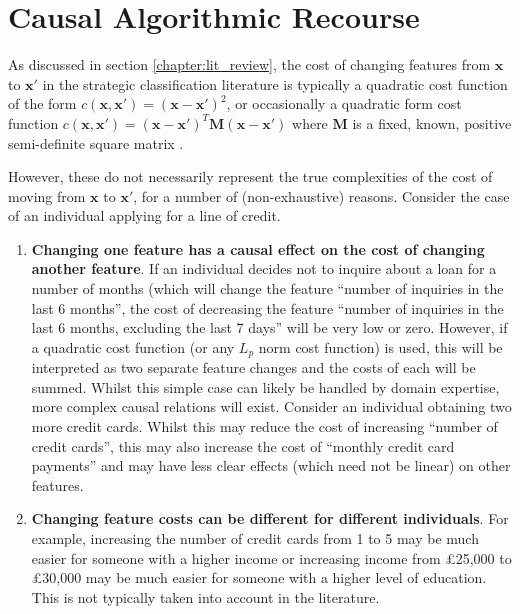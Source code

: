 \chapter{Causal Algorithmic Recourse} \label{chapter:causal_recourse}

As discussed in section \ref{chapter:lit_review}, the cost of changing features from $\boldsymbol{x}$ to $\boldsymbol{x}'$ in the strategic classification literature is typically a quadratic cost function of the form $c(\boldsymbol{x}, \boldsymbol{x}') = (\boldsymbol{x} - \boldsymbol{x}')^2$, or occasionally a quadratic form cost function $c(\boldsymbol{x}, \boldsymbol{x}') = (\mathbf{x-x'})^T\mathbf{M}(\mathbf{x-x'})$ where $\mathbf{M}$ is a fixed, known, positive semi-definite square matrix \citep{bechavodInformationDiscrepancyStrategic2022}. 

However, these do not necessarily represent the true complexities of the cost of moving from $\boldsymbol{x}$ to $\boldsymbol{x}'$, for a number of (non-exhaustive) reasons. Consider the case of an individual applying for a line of credit.

\begin{enumerate}
	\item \textbf{Changing one feature has a causal effect on the cost of changing another feature}. If an individual decides not to inquire about a loan for a number of months (which will change the feature ``number of inquiries in the last 6 months'', the cost of decreasing the feature ``number of inquiries in the last 6 months, excluding the last 7 days'' will be very low or zero. However, if a quadratic cost function (or any $L_p$ norm cost function) is used, this will be interpreted as two separate feature changes and the costs of each will be summed. Whilst this simple case can likely be handled by domain expertise, more complex causal relations will exist. Consider an individual obtaining two more credit cards. Whilst this may reduce the cost of increasing ``number of credit cards'', this may also increase the cost of ``monthly credit card payments'' and may have less clear effects (which need not be linear) on other features. 
	
	\item \textbf{Changing feature costs can be different for different individuals}. For example, increasing the number of credit cards from 1 to 5 may be much easier for someone with a higher income or increasing income from £25,000 to £30,000 may be much easier for someone with a higher level of education. This is not typically taken into account in the literature.
\end{enumerate}

